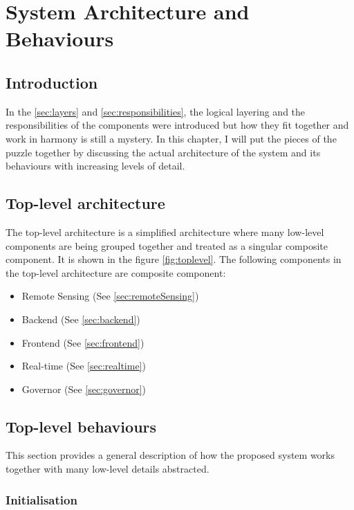 \documentclass[../thesis.tex]{subfiles}
\begin{document}
\chapter{System Architecture and Behaviours}
\label{chap:arch}

\section{Introduction}

In the \autoref{sec:layers} and \autoref{sec:responsibilities}, the logical layering and the responsibilities of the components were introduced but how they fit together and work in harmony is still a mystery. In this chapter, I will put the pieces of the puzzle together by discussing the actual architecture of the system and its behaviours with increasing levels of detail.


\section{Top-level architecture}

The top-level architecture is a simplified architecture where many low-level components are being grouped together and treated as a singular composite component. It is shown in the figure \ref{fig:toplevel}. The following components in the top-level architecture are composite component:

\begin{itemize}
\item Remote Sensing (See \autoref{sec:remoteSensing})
\item Backend (See \autoref{sec:backend})
\item Frontend (See \autoref{sec:frontend})
\item Real-time (See \autoref{sec:realtime})
\item Governor (See \autoref{sec:governor})
\end{itemize}


\section{Top-level behaviours}

This section provides a general description of how the proposed system works together with many low-level details abstracted.

\subsection{Initialisation}
\end{document}
